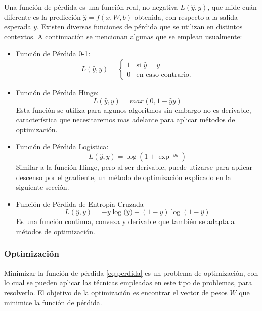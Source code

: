 \documentclass[a4paper,11pt,spanish]{book}
\begin{document}
	  Una función de pérdida es una función real, no negativa $L({\widehat y}, y)$, que mide cuán diferente es la predicción ${\widehat y}= f(x, W, b)$ obtenida, con respecto a la
	  salida esperada $y$. 
	  Existen diversas funciones de pérdida que se utilizan en distintos contextos. A continuación se mencionan algunas que se emplean usualmente:
	  
	  \begin{itemize}
	    \item Función de Pérdida 0-1:
	      \begin{equation*}
		L({\widehat y}, y) =  \begin{cases}
					    1 & \text{si ${\widehat y} = y$} \\
					    0 & \text{en caso contrario.}
		                      \end{cases}
	      \end{equation*}
	    \item Función de Pérdida Hinge:
	      \begin{equation*}
		L({\widehat y}, y) =  max(0, 1 - {\widehat y}y)
	      \end{equation*}
	      Esta función se utiliza para algunos algoritmos sin embargo no es derivable, característica que necesitaremos mas adelante para aplicar métodos de optimización.
	    \item Función de Pérdida Logística:
	      \begin{equation*}
		L({\widehat y}, y) =  {\log(1+ {\exp^{-{\widehat y}y}})}
	      \end{equation*}
	      Similar a la función Hinge, pero al ser derivable, puede utizarse para aplicar descenso por el gradiente, un método de optimización explicado en la siguiente sección.
	    \item Función de Pérdida de Entropía Cruzada
	      \begin{equation} \label{eq:cross_entropy}
		L({\widehat y}, y) = -y{\log({\widehat y}}) - (1-y) {\log(1-{\widehat y})}
	      \end{equation}
	      Es una función continua, convexa y derivable que también se adapta a métodos de optimización.

	  \end{itemize}

    \subsubsection{Optimización} \label{sec:optimizacion}
      Minimizar la función de pérdida \eqref{eq:perdida} es un problema de optimización, con lo cual se pueden aplicar las técnicas empleadas 
      en este tipo de problemas, para resolverlo.
      El objetivo de la optimización es encontrar el vector de pesos $W$ que minimice la función de pérdida.
      
\end{document}
